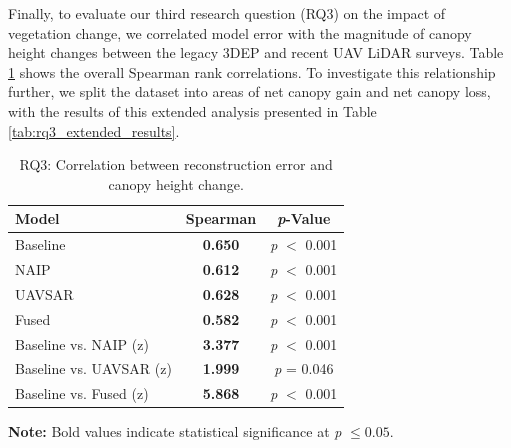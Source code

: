 \documentclass[12pt]{report}
\begin{document}
Finally, to evaluate our third research question (RQ3) on the impact of vegetation change, we correlated model error with the magnitude of canopy height changes between the legacy 3DEP and recent UAV LiDAR surveys. Table \ref{tab:rq3_results} shows the overall Spearman rank correlations. To investigate this relationship further, we split the dataset into areas of net canopy gain and net canopy loss, with the results of this extended analysis presented in Table \ref{tab:rq3_extended_results}.

\begin{table}[H]
\centering
\caption{RQ3: Correlation between reconstruction error and canopy height change.}
\begin{tabular}{lcc}
\toprule
\textbf{Model} & \textbf{Spearman \boldmath{$\rho$}} & \textbf{\textit{p}-Value} \\
\midrule
Baseline & \textbf{0.650
} & \emph{p} $<$ 0.001 \\
NAIP & \textbf{0.612} & \emph{p} $<$ 0.001 \\
UAVSAR & \textbf{0.628} & \emph{p} $<$ 0.001 \\
Fused & \textbf{0.582} & \emph{p} $<$ 0.001 \\
\midrule
Baseline vs. NAIP (z) & \textbf{3.377} & \emph{p} $<$ 0.001 \\
Baseline vs. UAVSAR (z) & \textbf{1.999} & \emph{p} = 0.046 \\
Baseline vs. Fused (z) & \textbf{5.868} & \emph{p} $<$ 0.001 \\
\bottomrule
\end{tabular}
\label{tab:rq3_results}

\vspace{2pt}
\footnotesize\textbf{Note:} Bold values indicate statistical significance at \emph{p} $\leq 0.05$.
\end{table}
\vspace{-10pt}
\end{document}
